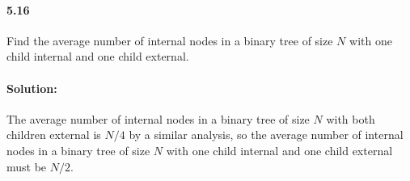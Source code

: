 \documentclass{article}
\begin{document}
\paragraph{5.16} Find the average number of internal nodes in a binary tree of
size $N$ with one child internal and one child external.

\paragraph{Solution:} The average number of internal nodes in a binary tree of
size $N$ with both children external is $N/4$ by a similar analysis, so the
average number of internal nodes in a binary tree of size $N$ with one child
internal and one child external must be $N/2$.
\end{document}
